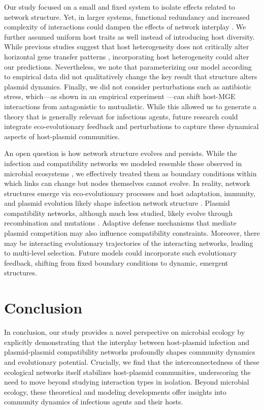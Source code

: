 \documentclass[10pt,letterpaper]{article}
\begin{document}
Our study focused on a small and fixed system to isolate effects related to network structure.
Yet, in larger systems, functional redundancy and increased complexity of interactions could dampen the effects of network interplay \cite{Biggs2020-kg, Wood2021-nn, Puente-Sanchez2024-cb}. We further assumed uniform host traits as well instead of introducing host diversity. While previous studies suggest that host heterogeneity does not critically alter horizontal gene transfer patterns \cite{Zhu2024-rr}, incorporating host heterogeneity could alter our predictions. Nevertheless, we note that parameterizing our model according to empirical data did not qualitatively change the key result that structure alters plasmid dynamics. 
Finally, we did not consider perturbations such as antibiotic stress, which---as shown in an empirical experiment \cite{Schaal2025-yu}---can shift host-MGE interactions from antagonistic to mutualistic. While this allowed us to generate a theory that is generally relevant for infectious agents, future research could integrate eco-evolutionary feedback and perturbations to capture these dynamical aspects of host-plasmid communities. 

An open question is how network structure evolves and persists. While the infection and compatibility networks we modeled resemble those observed in microbial ecosystems \cite{Weitz2013-ye, Flores2011-fx, Pilosof2020-lz, Light2005-es, Liu2022-mq, Rawstern2023-ua, Yang2020-cf}, we effectively treated them as boundary conditions within which links can change but nodes themselves cannot evolve. In reality, network structures emerge via eco-evolutionary processes \cite{Beckett2013-tz, Pilosof2020-lz, Pilosof2023-kx} and host adaptation, immunity, and plasmid evolution likely shape infection network structure \cite{Weitz2013-ye, Pilosof2023-kx}. Plasmid compatibility networks, although much less studied, likely evolve through recombination \cite{Rodriguez-Beltran2021-ue} and mutations \cite{Santos-Lopez2017-sf}. Adaptive defense mechanisms that mediate plasmid competition \cite{Pinilla-Redondo2020-if, Rocha2022-ub} may also influence compatibility constraints. Moreover, there may be interacting evolutionary trajectories of the interacting networks, leading to multi-level selection. Future models could incorporate such evolutionary feedback, shifting from fixed boundary conditions to dynamic, emergent structures.

\section*{Conclusion}
In conclusion, our study provides a novel perspective on microbial ecology by explicitly demonstrating that the interplay between host-plasmid infection and plasmid-plasmid compatibility networks profoundly shapes community dynamics and evolutionary potential. Crucially, we find that the interconnectedness of these ecological networks itself stabilizes host-plasmid communities, underscoring the need to move beyond studying interaction types in isolation. Beyond microbial ecology, these theoretical and modeling developments offer insights into community dynamics of infectious agents and their hosts.
\end{document}
